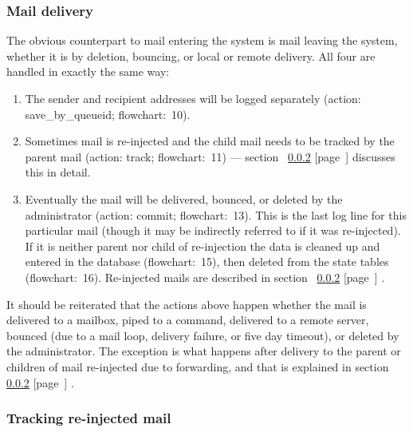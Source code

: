 \documentclass[a4paper,12pt,draft]{article}
\newcommand{\refwithpage}[1]{%
    \empty{}\ref{#1} [page~\pageref{#1}]%
}
\begin{document}
\subsubsection{Mail delivery}

\label{mail-delivery}

The obvious counterpart to mail entering the system is mail leaving the
system, whether it is by deletion, bouncing, or local or remote delivery.
All four are handled in exactly the same way:

\begin{enumerate}

    \item The sender and recipient addresses will be logged separately
        (action: save\_by\_queueid; flowchart:~10).

    \item Sometimes mail is re-injected and the child mail needs to be
        tracked by the parent mail (action: track; flowchart:~11) ---
        section~\refwithpage{tracking re-injected mail} discusses this in
        detail.

    \item Eventually the mail will be delivered, bounced, or deleted by the
        administrator (action: commit; flowchart:~13).  This is the last
        log line for this particular mail (though it may be indirectly
        referred to if it was re-injected).  If it is neither parent nor
        child of re-injection the data is cleaned up and entered in the
        database (flowchart:~15), then deleted from the state tables
        (flowchart:~16).  Re-injected mails are described in
        section~\refwithpage{tracking re-injected mail}.

\end{enumerate}

It should be reiterated that the actions above happen whether the mail is
delivered to a mailbox, piped to a command, delivered to a remote server,
bounced (due to a mail loop, delivery failure, or five day timeout), or
deleted by the administrator.  The exception is what happens after delivery
to the parent or children of mail re-injected due to forwarding, and that
is explained in section~\refwithpage{tracking re-injected mail}.

\subsubsection{Tracking re-injected mail}

\label{tracking re-injected mail}
\end{document}
